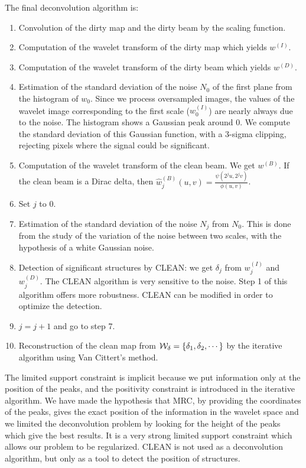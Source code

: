 \bigskip

The final deconvolution algorithm is:
\begin{enumerate}
\item Convolution of the dirty map and the dirty beam by the scaling function.
\item Computation of the wavelet transform of the dirty map which yields 
$w^{(I)}$.
\item Computation of the wavelet transform of the dirty beam which yields 
$w^{(D)}$.
\item Estimation of the standard deviation of the noise $N_0$ of the first 
plane
from the histogram of $w_0$. Since we process oversampled images, the
values of the
wavelet image corresponding to the first scale ($w_0^{(I)}$) are nearly 
always due to the noise. The histogram shows a Gaussian peak around
$0$. We compute the standard deviation of this Gaussian function,
with a 3-sigma clipping, rejecting pixels where the signal
could be significant.
\item Computation of the wavelet transform of the clean beam. We get $w^{(B)}$.
If the  clean beam is a Dirac delta, 
then $\hat{w}_j^{(B)}(u,v) = \frac{\psi(2^ju, 
2^jv)}{\phi(u, v)}$.
\item Set $j$ to 0. 
\item Estimation of the standard deviation of the noise $N_j$ from $N_0$. This
is done from the study of the variation of the noise between two
scales, with the hypothesis of a white Gaussian noise.
\item Detection of significant structures by CLEAN: we get $\delta_j$ from
$w_j^{(I)}$ and $w_j^{(D)}$. The CLEAN algorithm is very sensitive to the
noise. Step 1 of this algorithm offers more robustness. CLEAN
can be modified in order to optimize the detection. 
\item $j = j + 1$ and go to step 7.
\item Reconstruction of the clean map from ${\cal W}_{\delta}= \{\delta_1, \delta_2, \cdots\}$ by the 
iterative algorithm using Van Cittert's method.
\end{enumerate}

The limited support constraint is implicit because we put information
only at the position of the peaks, and the positivity constraint is 
 introduced in the iterative algorithm. 
We have made the hypothesis that MRC, 
by providing the coordinates of the peaks,
 gives the exact position of the information in the wavelet space and 
we limited the deconvolution problem by looking for the  height of the peaks 
which give the best results. It is a very strong limited support
constraint which allows our problem to be regularized. CLEAN is not used as a 
deconvolution algorithm, but only as a tool to detect the position of 
structures.




